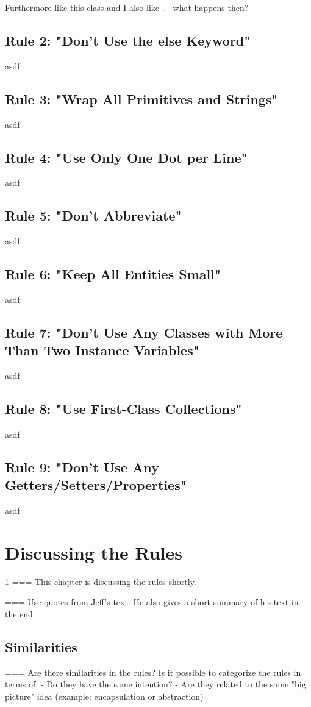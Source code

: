 Furthermore like this class  and I also like .  - what happens then?

\subsection{Rule 2: "Don’t Use the else Keyword"}
asdf
\subsection{Rule 3: "Wrap All Primitives and Strings"}
asdf
\subsection{Rule 4: "Use Only One Dot per Line"}
asdf
\subsection{Rule 5: "Don't Abbreviate"}
asdf
\subsection{Rule 6: "Keep All Entities Small"}
asdf
\subsection{Rule 7: "Don’t Use Any Classes with More Than Two Instance Variables"}
asdf
\subsection{Rule 8: "Use First-Class Collections"}
asdf
\subsection{Rule 9: "Don’t Use Any Getters/Setters/Properties"}
asdf
\section{Discussing the Rules}
\label{d:discussion}
\ref{d:discussion}
=== This chapter is discussing the rules shortly. 

=== Use quotes from Jeff's text: He also gives a short summary of his text in the end

\subsection{Similarities}
=== Are there similarities in the rules? Is it possible to categorize the rules in terms of: 
 - Do they have the same intention?
 - Are they related to the same "big picture" idea (example: encapsulation or abstraction) 

